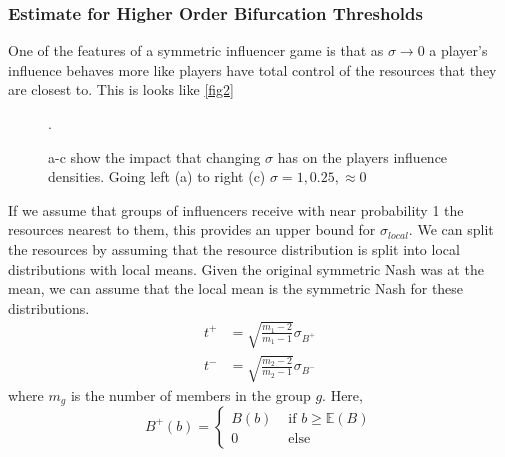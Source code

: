 \documentclass{article}
\begin{document}
            \subsubsection{Estimate for Higher Order Bifurcation Thresholds}
                One of the features of a symmetric influencer game is that as $\sigma\to 0$ a player's influence behaves more like players have total control of the resources that they are closest to. This is looks like \cref{fig2}

                \begin{figure}[htbp!]
                \centering
                    \begin{subfigure}[b]{0.3\linewidth}
                        
                    \end{subfigure}
                    \begin{subfigure}[b]{0.3\linewidth}
                       
                    \end{subfigure}
                    \begin{subfigure}[b]{0.3\linewidth}
                       
                    \end{subfigure}
                    \caption{a-c show the impact that changing $\sigma$ has on the players influence densities. Going left (a) to right (c) $\sigma=1,0.25,\approx 0$}.
                    \label{fig:2}
                \end{figure}
                If we assume that groups of influencers receive with near probability 1 the resources nearest to them, this provides an upper bound for $\sigma_{local}$. We can split the resources by assuming that the resource distribution is split into local distributions with local means. Given the original symmetric Nash was at the mean, we can assume that the local mean is the symmetric Nash for these distributions.
                \begin{align}
                    t^+&=\sqrt{\frac{m_{1}-2}{m_{1}-1}}\sigma_{B^+} \\ %
                    t^-&=\sqrt{\frac{m_{2}-2}{m_{2}-1}}\sigma_{B^-}
                \end{align}
                where $m_{g}$ is the number of members in the group $g$. 
                Here, 
                \begin{equation}
                    B^+(b)=\begin{cases}
                        B(b) & \text{ if } b\geq \mathbb{E}(B) \\ %
                        0 & \text{ else }
                    \end{cases}
                \end{equation}
\end{document}
